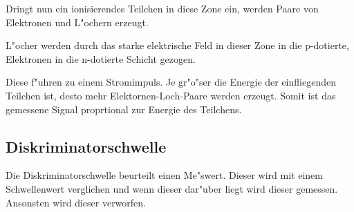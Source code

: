 Dringt nun ein ionisierendes Teilchen in diese Zone ein, werden Paare von Elektronen und L"ochern erzeugt.

L"ocher werden durch das starke elektrische Feld in dieser Zone in die p-dotierte, Elektronen in die n-dotierte Schicht gezogen.

Diese f"uhren zu einem Stromimpuls. Je gr"o"ser die Energie der einfliegenden Teilchen ist, desto mehr Elektornen-Loch-Paare werden erzeugt. Somit ist das gemessene Signal proprtional zur Energie des Teilchens.

\subsection{Diskriminatorschwelle} %
\label{sub:diskreminatorschwelle}

Die Diskriminatorschwelle beurteilt einen Me"swert. Dieser wird mit einem Schwellenwert verglichen und wenn dieser dar"uber liegt wird dieser gemessen. Ansonsten wird dieser verworfen.

\clearpage

